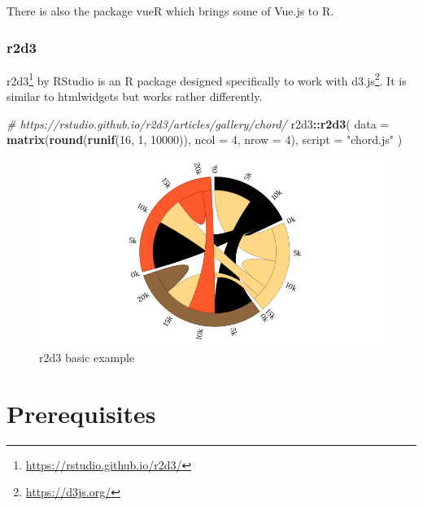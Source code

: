 \documentclass[10pt,]{krantz}
\makeatletter
\newenvironment{Shaded}{\begin{snugshade}}{\end{snugshade}}
\newcommand{\CommentTok}[1]{\textcolor[rgb]{0.37,0.37,0.37}{\textit{#1}}}
\newcommand{\DataTypeTok}[1]{\textcolor[rgb]{0.27,0.27,0.27}{#1}}
\newcommand{\DecValTok}[1]{\textcolor[rgb]{0.06,0.06,0.06}{#1}}
\newcommand{\KeywordTok}[1]{\textcolor[rgb]{0.27,0.27,0.27}{\textbf{#1}}}
\newcommand{\NormalTok}[1]{#1}
\newcommand{\OperatorTok}[1]{\textcolor[rgb]{0.43,0.43,0.43}{\textbf{#1}}}
\newcommand{\StringTok}[1]{\textcolor[rgb]{0.5,0.5,0.5}{#1}}
\renewcommand{\href}[2]{#2\footnote{\url{#1}}}
\newenvironment{kframe}{%
\medskip{}
\setlength{\fboxsep}{.8em}
 \def\at@end@of@kframe{}%
 \ifinner\ifhmode%
  \def\at@end@of@kframe{\end{minipage}}%
  \begin{minipage}{\columnwidth}%
 \fi\fi%
 \def\FrameCommand##1{\hskip\@totalleftmargin \hskip-\fboxsep
 \colorbox{shadecolor}{##1}\hskip-\fboxsep
     \hskip-\linewidth \hskip-\@totalleftmargin \hskip\columnwidth}%
 \MakeFramed {\advance\hsize-\width
   \@totalleftmargin\z@ \linewidth\hsize
   \@setminipage}}%
 {\par\unskip\endMakeFramed%
 \at@end@of@kframe}
\renewenvironment{Shaded}{\begin{kframe}}{\end{kframe}}
\makeatother
\begin{document}
There is also the package vueR \citep{R-vueR} which brings some of Vue.js to R.

\hypertarget{intro-r2d3}{%
\subsection{r2d3}\label{intro-r2d3}}

\href{https://rstudio.github.io/r2d3/}{r2d3} \citep{R-r2d3} by RStudio is an R package designed specifically to work with \href{https://d3js.org/}{d3.js}. It is similar to htmlwidgets but works rather differently.

\begin{Shaded}
\begin{Highlighting}[]
\CommentTok{# https://rstudio.github.io/r2d3/articles/gallery/chord/}
\NormalTok{r2d3}\OperatorTok{::}\KeywordTok{r2d3}\NormalTok{(}
  \DataTypeTok{data =} \KeywordTok{matrix}\NormalTok{(}\KeywordTok{round}\NormalTok{(}\KeywordTok{runif}\NormalTok{(}\DecValTok{16}\NormalTok{, }\DecValTok{1}\NormalTok{, }\DecValTok{10000}\NormalTok{)), }\DataTypeTok{ncol =} \DecValTok{4}\NormalTok{, }\DataTypeTok{nrow =} \DecValTok{4}\NormalTok{), }
  \DataTypeTok{script =} \StringTok{"chord.js"}
\NormalTok{)}
\end{Highlighting}
\end{Shaded}

\begin{figure}[H]

{\centering \includegraphics[width=1\linewidth]{images/01-d3} 

}

\caption{r2d3 basic example}\label{fig:r2d3}
\end{figure}

\hypertarget{prerequisites}{%
\chapter{Prerequisites}\label{prerequisites}}
\end{document}
